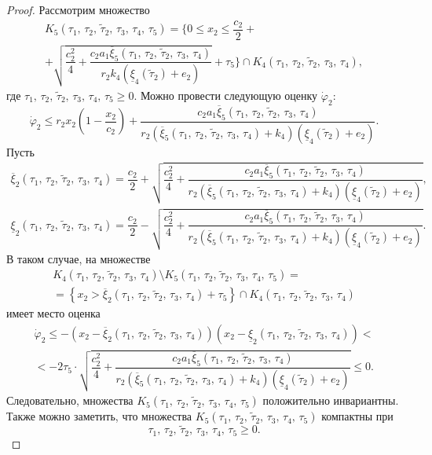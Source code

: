 \documentclass[14pt,a4paper]{extarticle}
\begin{document}
\begin{proof}
		Рассмотрим множество 
		\begin{multline*}
			K_5(\tau_1,\,\tau_2,\,\tilde{\tau}_2,\,\tau_3,\,\tau_4,\,\tau_5) = \biggr\{0 \leqslant x_2 \leqslant \dfrac{c_2}{2}+\\
			+\sqrt{\dfrac{c_2^2}{4}+\dfrac{c_2a_1\overline{\xi}_5(\tau_1,\,\tau_2,\,\tilde{\tau}_2,\,\tau_3,\,\tau_4)}{r_2k_4(\underline{\xi}_4(\tilde{\tau}_2)+e_2)}}+\tau_5\biggr\}\cap K_4(\tau_1,\,\tau_2,\,\tilde{\tau}_2,\,\tau_3,\,\tau_4),
		\end{multline*}
		где $\tau_1,\,\tau_2,\,\tilde{\tau}_2,\,\tau_3,\,\tau_4,\,\tau_5 \geqslant 0$.
		Можно провести следующую оценку $\dot{\varphi}_2$:
		\[\dot{\varphi}_2 \leqslant r_2x_2\left(1-\dfrac{x_2}{c_2}\right)+\dfrac{c_2a_1\overline{\xi}_5(\tau_1,\,\tau_2,\,\tilde{\tau}_2,\,\tau_3,\,\tau_4)}{r_2(\overline{\xi}_5(\tau_1,\,\tau_2,\,\tilde{\tau}_2,\,\tau_3,\,\tau_4)+k_4)(\underline{\xi}_4(\tilde{\tau}_2)+e_2)}.\]
		Пусть
		\begin{align*}
			\overline{\xi}_2(\tau_1,\,\tau_2,\,\tilde{\tau}_2,\,\tau_3,\,\tau_4) = \dfrac{c_2}{2}+\sqrt{\dfrac{c_2^2}{4}+\dfrac{c_2a_1\overline{\xi}_5(\tau_1,\,\tau_2,\,\tilde{\tau}_2,\,\tau_3,\,\tau_4)}{r_2(\overline{\xi}_5(\tau_1,\,\tau_2,\,\tilde{\tau}_2,\,\tau_3,\,\tau_4)+k_4)(\underline{\xi}_4(\tilde{\tau}_2)+e_2)}},\\
			\underline{\xi}_2(\tau_1,\,\tau_2,\,\tilde{\tau}_2,\,\tau_3,\,\tau_4) = \dfrac{c_2}{2}-\sqrt{\dfrac{c_2^2}{4}+\dfrac{c_2a_1\overline{\xi}_5(\tau_1,\,\tau_2,\,\tilde{\tau}_2,\,\tau_3,\,\tau_4)}{r_2(\overline{\xi}_5(\tau_1,\,\tau_2,\,\tilde{\tau}_2,\,\tau_3,\,\tau_4)+k_4)(\underline{\xi}_4(\tilde{\tau}_2)+e_2)}}.
		\end{align*}
		В таком случае, на множестве 
		\begin{multline*}
			K_4(\tau_1,\,\tau_2,\,\tilde{\tau}_2,\,\tau_3,\,\tau_4)\setminus K_5(\tau_1,\,\tau_2,\,\tilde{\tau}_2,\,\tau_3,\,\tau_4,\,\tau_5) =\\
			=\left\{x_2 > \overline{\xi}_2(\tau_1,\,\tau_2,\,\tilde{\tau}_2,\,\tau_3,\,\tau_4)+\tau_5\right\}\cap K_4(\tau_1,\,\tau_2,\,\tilde{\tau}_2,\,\tau_3,\,\tau_4)
		\end{multline*}
		имеет место оценка
		\begin{multline*}
			\dot{\varphi}_2 \leqslant -(x_2 - \overline{\xi}_2(\tau_1,\,\tau_2,\,\tilde{\tau}_2,\,\tau_3,\,\tau_4))(x_2 - \underline{\xi}_2(\tau_1,\,\tau_2,\,\tilde{\tau}_2,\,\tau_3,\,\tau_4)) <\\
			< -2\tau_5\cdot\sqrt{\dfrac{c_2^2}{4}+\dfrac{c_2a_1\overline{\xi}_5(\tau_1,\,\tau_2,\,\tilde{\tau}_2,\,\tau_3,\,\tau_4)}{r_2(\overline{\xi}_5(\tau_1,\,\tau_2,\,\tilde{\tau}_2,\,\tau_3,\,\tau_4)+k_4)(\underline{\xi}_4(\tilde{\tau}_2)+e_2)}} \leqslant 0.
		\end{multline*}
		Следовательно, множества $K_5(\tau_1,\,\tau_2,\,\tilde{\tau}_2,\,\tau_3,\,\tau_4,\,\tau_5)$ положительно инвариантны. Также можно заметить, что множества $K_5(\tau_1,\,\tau_2,\,\tilde{\tau}_2,\,\tau_3,\,\tau_4,\,\tau_5)$ компактны при
		\[\tau_1,\,\tau_2,\,\tilde{\tau}_2,\,\tau_3,\,\tau_4,\,\tau_5 \geqslant 0.\]
		

\end{proof}
\end{document}
